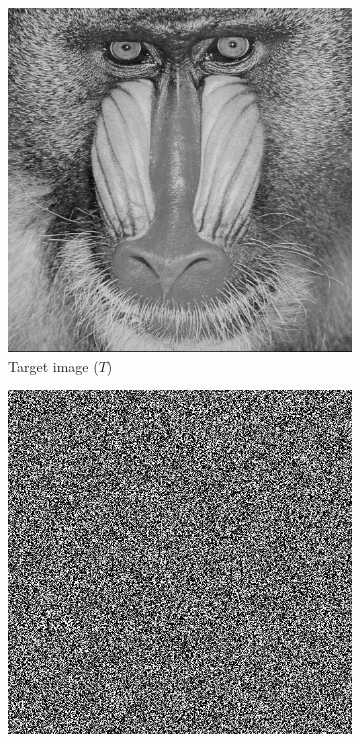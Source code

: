 \begin{figure}[H]
  \centering
  \begin{subfigure}[t]{0.3\textwidth}
    \centering
    \includegraphics[width=\textwidth]{mandrill.png}
    \caption{Target image ($T$)}
  \end{subfigure}
  \hfill
  \begin{subfigure}[t]{0.3\textwidth}
    \centering
    \includegraphics[width=\textwidth]{GS_holo_i_30.png}

\end{subfigure}
\end{figure}

